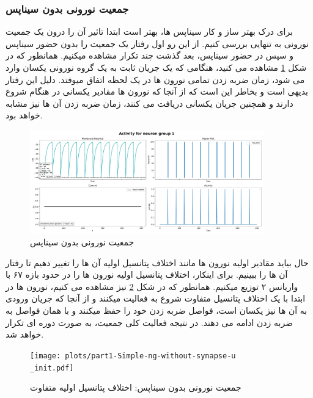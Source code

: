         \subsubsection*{جمعیت نورونی بدون سیناپس}
        برای درک بهتر ساز و کار سیناپس ها، بهتر است ابتدا تاثیر آن را درون یک جمعیت نورونی به تنهایی بررسی کنیم. از این رو اول رفتار یک جمعیت را بدون حضور سیناپس و سپس در حضور سیناپس، بعد گذشت چند تکرار مشاهده میکنیم. 
        همانطور که در شکل 
        \ref{fig:part1-simple-ng}
        مشاهده می کنید، هنگامی که یک جریان ثابت به یک گروه نورونی یکسان وارد می شود، زمان ضربه زدن تمامی نورون ها در یک لحظه اتفاق میوفتد. دلیل این رفتار بدیهی است و بخاطر این است که از آنجا که نورون ها مقادیر یکسانی در هنگام شروع دارند و همچنین جریان یکسانی دریافت می کنند، زمان ضربه زدن آن ها نیز مشابه خواهد بود.
        \begin{figure}[!ht]
            \centering
            \includegraphics[width=0.9\textwidth]{plots/part1-Simple-ng-without-synapse.pdf} 
            \caption{جمعیت نورونی بدون سیناپس}
            \label{fig:part1-simple-ng}
        \end{figure}

        حال بیاید مقادیر اولیه نورون ها مانند اختلاف پتانسیل اولیه آن ها را تغییر دهیم تا رفتار آن ها را ببینیم. برای اینکار، اختلاف پتانسیل اولیه نورون ها را در حدود بازه ۶۷ با واریانس ۲ توزیع میکنیم. همانطور که در شکل
        \ref{fig:part1-simple-ng-u-init}
        نیز مشاهده می کنیم، نورون ها در ابتدا با یک اختلاف پتانسیل متفاوت شروع به فعالیت میکنند و از آنجا که جریان ورودی به آن ها نیز یکسان است، فواصل ضربه زدن خود را حفظ میکنند و با همان فواصل به ضربه زدن ادامه می دهند. در نتیجه فعالیت کلی جمعیت، به صورت دوره ای تکرار خواهد شد.
        \begin{figure}[!ht]
            \centering
            \texttt{[image: plots/part1-Simple-ng-without-synapse-u\\\_init.pdf]} 
            \caption{جمعیت نورونی بدون سیناپس: اختلاف پتانسیل اولیه متفاوت}
            \label{fig:part1-simple-ng-u-init}
        \end{figure}


